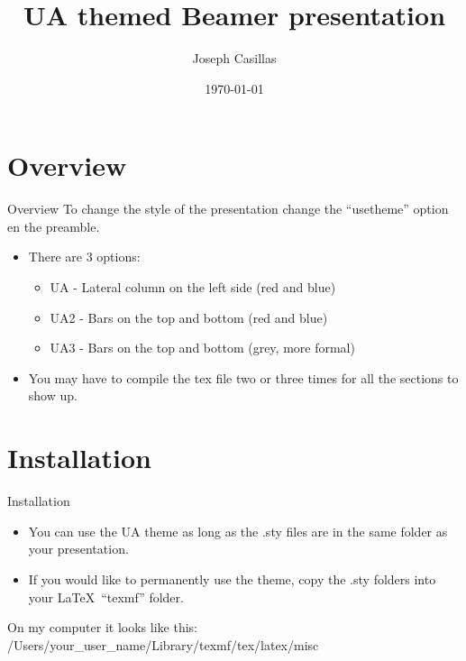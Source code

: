 \documentclass{beamer}
\title{UA themed Beamer presentation}
\author[Casillas]{Joseph Casillas}
\institute{Universidad de Arizona}
\date{\today}
\begin{document}
\begin{frame}%
  \titlepage
\end{frame}

\begin{frame}
	\tableofcontents
\end{frame}

\section{Overview} %
\label{sec:overview}

\begin{frame}{Overview}
	To change the style of the presentation change the ``usetheme'' option en the preamble. \pause
	\begin{itemize}
		\item There are 3 options: \pause
		\begin{itemize}
			\item UA - Lateral column on the left side (red and blue) 
			\item UA2 - Bars on the top and bottom (red and blue) 
			\item UA3 - Bars on the top and bottom (grey, more formal) 
		\end{itemize} \pause
		\item You may have to compile the tex file two or three times for all the sections to show up.
	\end{itemize}
\end{frame}


\section{Installation} %
\label{sec:installation}

\begin{frame}{Installation}
	\begin{itemize}
		\item You can use the UA theme as long as the .sty files are in the same folder as your presentation.
		\item If you would like to permanently use the theme, copy the .sty folders into your \LaTeX\ ``texmf'' folder.
	\end{itemize}
	On my computer it looks like this: \\
	\vspace{2.5mm}
	/Users/{your\_user\_name}/Library/texmf/tex/latex/misc
\end{frame}
\end{document}
